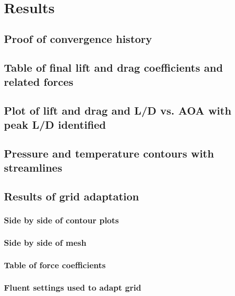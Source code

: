 \section{Results}

\subsection{Proof of convergence history}

\subsection{Table of final lift and drag coefficients and related forces}

\subsection{Plot of lift and drag and L/D vs. AOA with peak L/D identified}

\subsection{Pressure and temperature contours with streamlines}

\subsection{Results of grid adaptation}

\subsubsection{Side by side of contour plots}

\subsubsection{Side by side of mesh}

\subsubsection{Table of force coefficients}

\subsubsection{Fluent settings used to adapt grid}